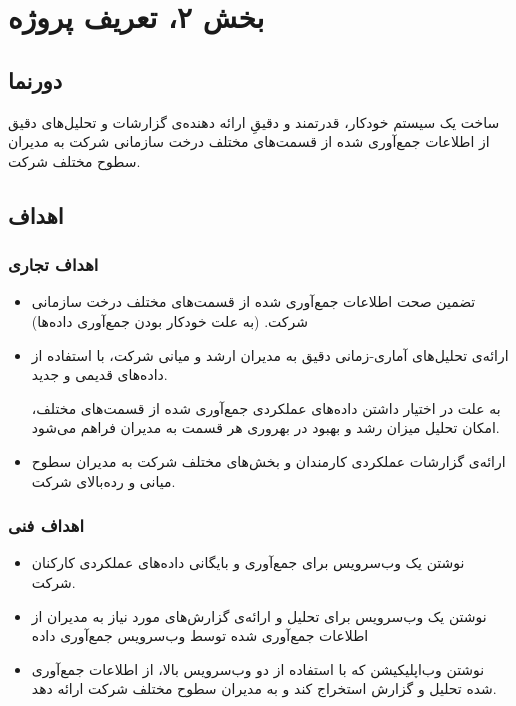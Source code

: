 \chapter{بخش ۲، تعریف پروژه\\}
\section{دورنما }
ساخت یک سیستم خودکار، قدرتمند و دقیقِ ارائه دهنده‌ی گزارشات و تحلیل‌های دقیق از اطلاعات جمع‌آوری شده از قسمت‌های مختلف درخت سازمانی شرکت  به مدیران سطوح مختلف شرکت.

\section{اهداف }
\subsection{اهداف تجاری}
\begin{itemize}
\item 
تضمین صحت اطلاعات جمع‌آوری شده از قسمت‌های مختلف درخت سازمانی شرکت. (به علت خودکار بودن جمع‌آوری داده‌ها)
\item 
ارائه‌ی تحلیل‌های آماری-زمانی دقیق به مدیران ارشد و میانی شرکت، با استفاده از داده‌های قدیمی و جدید.

به علت در اختیار‌ داشتن داده‌های عملکردی جمع‌آوری شده از قسمت‌های مختلف، امکان تحلیل میزان رشد و بهبود در بهروری هر قسمت به مدیران فراهم می‌شود.
\item 
ارائه‌ی گزارشات عملکردی کارمندان و بخش‌های مختلف شرکت به مدیران سطوح میانی و رده‌بالای شرکت.
\end{itemize}
\subsection{اهداف فنی}\label{tech-objective}
\begin{itemize}
\item
نوشتن یک وب‌سرویس برای جمع‌آوری و بایگانی داده‌های عملکردی کارکنان شرکت.
\item 
نوشتن یک وب‌سرویس برای تحلیل‌ و ارائه‌ی گزار‌ش‌های مورد نیاز به مدیران از اطلاعات جمع‌آوری شده توسط وب‌سرویس جمع‌آوری داده
\item 
نوشتن وب‌اپلیکیشن 
که با استفاده از دو وب‌سرویس بالا، از اطلاعات جمع‌آوری شده تحلیل و گزارش استخراج کند و به مدیران سطوح مختلف شرکت ارائه دهد.
\end{itemize}

